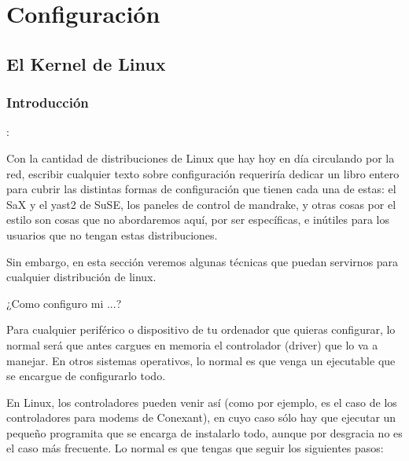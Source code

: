 

\chapter{Configuración}

\section{El Kernel de Linux}

\subsection{Introducción}:

Con  la  cantidad de  distribuciones  de  Linux  que  hay hoy  en  día
circulando por  la red,  escribir cualquier texto  sobre configuración
requeriría dedicar un libro entero para cubrir las distintas formas de
configuración que tienen cada una de estas: el SaX y el yast2 de SuSE,
los paneles  de control de mandrake,  y otras cosas por  el estilo son
cosas que  no abordaremos aquí,  por ser específicas, e  inútiles para
los usuarios que no tengan estas distribuciones.

Sin  embargo, en  esta  sección veremos  algunas  técnicas que  puedan
servirnos para cualquier distribución de linux.

¿Como configuro mi ...?

Para cualquier  periférico o dispositivo  de tu ordenador  que quieras
configurar, lo normal será que antes cargues en memoria el controlador
(driver) que lo va a manejar.  En otros sistemas operativos, lo normal
es que venga un ejecutable que se encargue de configurarlo todo.

En Linux, los controladores pueden venir  así (como por ejemplo, es el
caso de los controladores para modems  de Conexant), en cuyo caso sólo
hay que  ejecutar un pequeño  programita que se encarga  de instalarlo
todo, aunque por  desgracia no es el caso más  frecuente. Lo normal es
que tengas que seguir los siguientes pasos:

